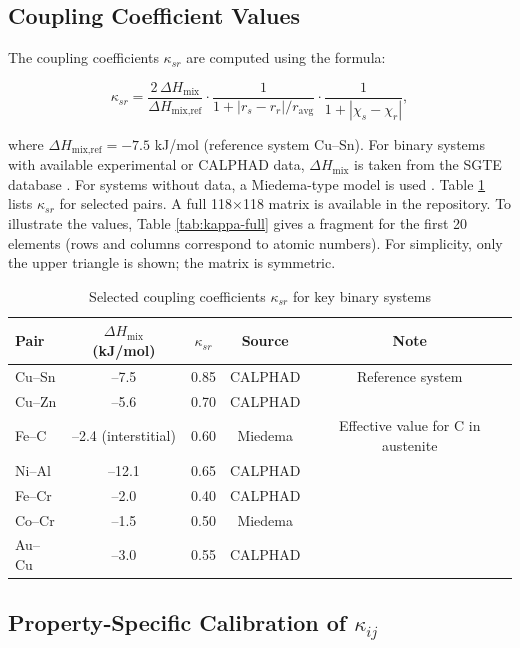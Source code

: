 \documentclass[12pt,a4paper]{article}
\begin{document}
	\subsection{Coupling Coefficient Values}
	
	The coupling coefficients \(\kappa_{sr}\) are computed using the formula:
	
	\[
	\kappa_{sr} = \frac{2\,\Delta H_{\text{mix}}}{\Delta H_{\text{mix,ref}}} \cdot
	\frac{1}{1 + |r_s - r_r|/r_{\text{avg}}} \cdot
	\frac{1}{1 + |\chi_s - \chi_r|},
	\]
	
	where \(\Delta H_{\text{mix,ref}} = -7.5\) kJ/mol (reference system Cu–Sn). For binary systems with available experimental or CALPHAD data, \(\Delta H_{\text{mix}}\) is taken from the SGTE database \cite{CALPHAD}. For systems without data, a Miedema-type model is used \cite{Miedema1980}. Table \ref{tab:kappa-values} lists \(\kappa_{sr}\) for selected pairs. A full 118×118 matrix is available in the repository. To illustrate the values, Table \ref{tab:kappa-full} gives a fragment for the first 20 elements (rows and columns correspond to atomic numbers). For simplicity, only the upper triangle is shown; the matrix is symmetric.
	
	\begin{table}[htbp]
		\centering
		\caption{Selected coupling coefficients \(\kappa_{sr}\) for key binary systems}
		\label{tab:kappa-values}
		\begin{tabular}{lcccc}
			\toprule
			Pair & \(\Delta H_{\text{mix}}\) (kJ/mol) & \(\kappa_{sr}\) & Source & Note \\
			\midrule
			Cu–Sn & –7.5 & 0.85 & CALPHAD & Reference system \\
			Cu–Zn & –5.6 & 0.70 & CALPHAD & \\
			Fe–C  & –2.4 (interstitial) & 0.60 & Miedema & Effective value for C in austenite \\
			Ni–Al & –12.1 & 0.65 & CALPHAD & \\
			Fe–Cr & –2.0 & 0.40 & CALPHAD & \\
			Co–Cr & –1.5 & 0.50 & Miedema & \\
			Au–Cu & –3.0 & 0.55 & CALPHAD & \\
			\bottomrule
		\end{tabular}
	\end{table}
	
	\subsection{Property‑Specific Calibration of \(\kappa_{ij}\)}
	\label{subsec:property-calibration}
	
\end{document}

